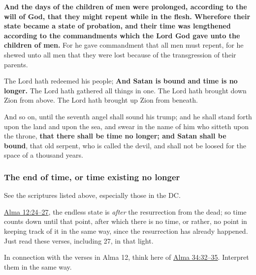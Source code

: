 		\begin{compactdesc}
			\item[{\hyperref[2NEPHI-2-21]{2 Nephi 2:21}}] \textbf{And the days of the children of men were prolonged, according to the will of God, that they might repent while in the flesh. Wherefore their state became a state of probation, and their time was lengthened according to the commandments which the Lord God gave unto the children of men.} For he gave commandment that all men must repent, for he shewed unto all men that they were lost because of the transgression of their parents.
			\item[{\hyperref[DC84-100]{DC 84:100}}] The Lord hath redeemed his people;
													\textbf{And Satan is bound and time is no longer.}
													The Lord hath gathered all things in one.
													The Lord hath brought down Zion from above.
													The Lord hath brought up Zion from beneath.
			\item[{\hyperref[DC88-110]{DC 88:110}}] And so on, until the seventh angel shall sound his trump; and he shall stand forth upon the land and upon the sea, and swear in the name of him who sitteth upon the throne, \textbf{that there shall be time no longer; and Satan shall be bound}, that old serpent, who is called the devil, and shall not be loosed for the space of a thousand years.
		\end{compactdesc}
		
	\subsubsection{The end of time, or time existing no longer}
		\label{TIME-end}
		
		\begin{compactitem}
			\item See the scriptures listed above, especially those in the DC.
			\item \hyperref[ALMA-12-24]{Alma 12:24--27}, the endless state is \textit{after} the resurrection from the dead; so time counts down until that point, after which there is no time, or rather, no point in keeping track of it in the same way, since the resurrection has already happened. Just read these verses, including 27, in that light.
			\item In connection with the verses in Alma 12, think here of \hyperref[ALMA-34-32]{Alma 34:32--35}. Interpret them in the same way.
		\end{compactitem}
